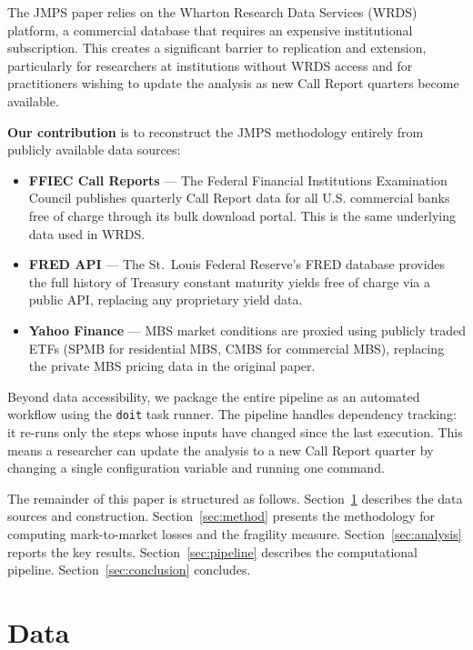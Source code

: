 \documentclass[12pt, a4paper]{article}
\begin{document}
The JMPS paper relies on the Wharton Research Data Services (WRDS) platform,
a commercial database that requires an expensive institutional subscription.
This creates a significant barrier to replication and extension, particularly
for researchers at institutions without WRDS access and for practitioners
wishing to update the analysis as new Call Report quarters become available.

\textbf{Our contribution} is to reconstruct the JMPS methodology entirely
from publicly available data sources:

\begin{itemize}
    \item \textbf{FFIEC Call Reports} --- The Federal Financial Institutions
    Examination Council publishes quarterly Call Report data for all U.S.
    commercial banks free of charge through its bulk download portal.
    This is the same underlying data used in WRDS.

    \item \textbf{FRED API} --- The St.\ Louis Federal Reserve's FRED database
    provides the full history of Treasury constant maturity yields free of charge
    via a public API, replacing any proprietary yield data.

    \item \textbf{Yahoo Finance} --- MBS market conditions are proxied using
    publicly traded ETFs (SPMB for residential MBS, CMBS for commercial MBS),
    replacing the private MBS pricing data in the original paper.
\end{itemize}

Beyond data accessibility, we package the entire pipeline as an automated
workflow using the \texttt{doit} task runner. The pipeline handles dependency
tracking: it re-runs only the steps whose inputs have changed since the last
execution. This means a researcher can update the analysis to a new Call Report
quarter by changing a single configuration variable and running one command.

The remainder of this paper is structured as follows. Section~\ref{sec:data}
describes the data sources and construction. Section~\ref{sec:method} presents
the methodology for computing mark-to-market losses and the fragility measure.
Section~\ref{sec:analysis} reports the key results. Section~\ref{sec:pipeline}
describes the computational pipeline. Section~\ref{sec:conclusion} concludes.

\section{Data}
\label{sec:data}
\end{document}
